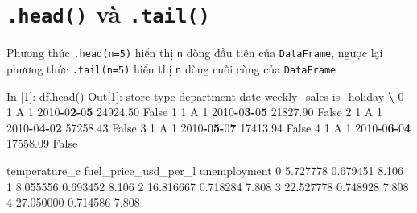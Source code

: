 \documentclass[
]{book}
\newenvironment{Shaded}{\begin{snugshade}}{\end{snugshade}}
\newcommand{\BuiltInTok}[1]{#1}
\newcommand{\DecValTok}[1]{\textcolor[rgb]{0.00,0.00,0.81}{#1}}
\newcommand{\ErrorTok}[1]{\textcolor[rgb]{0.64,0.00,0.00}{\textbf{#1}}}
\newcommand{\FloatTok}[1]{\textcolor[rgb]{0.00,0.00,0.81}{#1}}
\newcommand{\NormalTok}[1]{#1}
\newcommand{\OperatorTok}[1]{\textcolor[rgb]{0.81,0.36,0.00}{\textbf{#1}}}
\newcommand{\VariableTok}[1]{\textcolor[rgb]{0.00,0.00,0.00}{#1}}
\begin{document}
\hypertarget{head-vuxe0-.tail}{%
\section{\texorpdfstring{\texttt{.head()} và \texttt{.tail()}}{.head() và .tail()}}\label{head-vuxe0-.tail}}

Phương thức \texttt{.head(n=5)} hiển thị \texttt{n} dòng đầu tiên của \texttt{DataFrame}, ngược lại phương thức \texttt{.tail(n=5)} hiển thị \texttt{n} dòng cuối cùng của \texttt{DataFrame}

\begin{Shaded}
\begin{Highlighting}[]
\NormalTok{In [}\DecValTok{1}\NormalTok{]: df.head()}
\NormalTok{Out[}\DecValTok{1}\NormalTok{]:    }
\NormalTok{        store }\BuiltInTok{type}\NormalTok{  department        date  weekly\_sales  is\_holiday  }\OperatorTok{\textbackslash{}}
\DecValTok{0}      \DecValTok{1}\NormalTok{    A           }\DecValTok{1}  \DecValTok{2010}\OperatorTok{{-}}\DecValTok{0}\ErrorTok{2}\OperatorTok{{-}}\DecValTok{0}\ErrorTok{5}      \FloatTok{24924.50}       \VariableTok{False}   
\DecValTok{1}      \DecValTok{1}\NormalTok{    A           }\DecValTok{1}  \DecValTok{2010}\OperatorTok{{-}}\DecValTok{0}\ErrorTok{3}\OperatorTok{{-}}\DecValTok{0}\ErrorTok{5}      \FloatTok{21827.90}       \VariableTok{False}   
\DecValTok{2}      \DecValTok{1}\NormalTok{    A           }\DecValTok{1}  \DecValTok{2010}\OperatorTok{{-}}\DecValTok{0}\ErrorTok{4}\OperatorTok{{-}}\DecValTok{0}\ErrorTok{2}      \FloatTok{57258.43}       \VariableTok{False}   
\DecValTok{3}      \DecValTok{1}\NormalTok{    A           }\DecValTok{1}  \DecValTok{2010}\OperatorTok{{-}}\DecValTok{0}\ErrorTok{5}\OperatorTok{{-}}\DecValTok{0}\ErrorTok{7}      \FloatTok{17413.94}       \VariableTok{False}   
\DecValTok{4}      \DecValTok{1}\NormalTok{    A           }\DecValTok{1}  \DecValTok{2010}\OperatorTok{{-}}\DecValTok{0}\ErrorTok{6}\OperatorTok{{-}}\DecValTok{0}\ErrorTok{4}      \FloatTok{17558.09}       \VariableTok{False} 

\NormalTok{   temperature\_c  fuel\_price\_usd\_per\_l  unemployment  }
\DecValTok{0}       \FloatTok{5.727778}              \FloatTok{0.679451}         \FloatTok{8.106}  
\DecValTok{1}       \FloatTok{8.055556}              \FloatTok{0.693452}         \FloatTok{8.106}  
\DecValTok{2}      \FloatTok{16.816667}              \FloatTok{0.718284}         \FloatTok{7.808}  
\DecValTok{3}      \FloatTok{22.527778}              \FloatTok{0.748928}         \FloatTok{7.808}  
\DecValTok{4}      \FloatTok{27.050000}              \FloatTok{0.714586}         \FloatTok{7.808}  


\end{Highlighting}
\end{Shaded}
\end{document}
